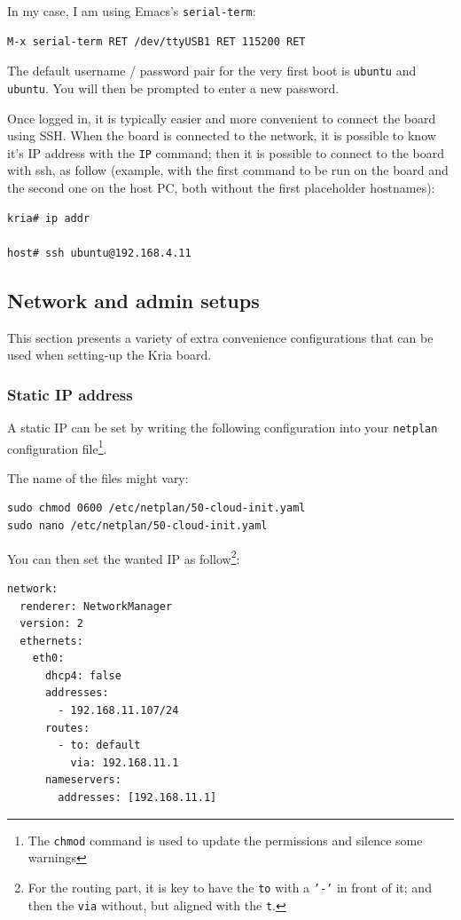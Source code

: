 \documentclass[10pt]{article}
\begin{document}
In my case, I am using Emacs's \texttt{serial-term}:
\begin{verbatim}
M-x serial-term RET /dev/ttyUSB1 RET 115200 RET
\end{verbatim}

The default username / password pair for the very first boot is \texttt{ubuntu} and \texttt{ubuntu}. You will then be prompted to enter a new password.

Once logged in, it is typically easier and more convenient to connect the board
using SSH. When the board is connected to the network, it is possible to know
it's IP address with the \texttt{IP} command; then it is possible to connect to
the board with ssh, as follow (example, with the first command to be run on the board
and the second one on the host PC, both without the first placeholder hostnames):
\begin{verbatim}
kria# ip addr

host# ssh ubuntu@192.168.4.11
\end{verbatim}

\subsection{Network and admin setups}
\label{sec:org530a03c}
This section presents a variety of extra convenience configurations
that can be used when setting-up the Kria board.

\subsubsection{Static IP address}
\label{sec:org158e635}
A static IP can be set by writing the following
configuration into your \texttt{netplan} configuration file\footnote{The \texttt{chmod} command is used to update the permissions and silence some warnings}.

The name of the files might vary:
\begin{verbatim}
sudo chmod 0600 /etc/netplan/50-cloud-init.yaml 
sudo nano /etc/netplan/50-cloud-init.yaml
\end{verbatim}

You can then set the wanted IP as follow\footnote{For the routing part, it is key to have the \texttt{to} with a \texttt{'-'} in front of
it; and then the \texttt{via} without, but aligned with the \texttt{t}.}:
\begin{verbatim}
network:
  renderer: NetworkManager
  version: 2
  ethernets:
    eth0:
      dhcp4: false
      addresses:
        - 192.168.11.107/24
      routes:
        - to: default
          via: 192.168.11.1
      nameservers:
        addresses: [192.168.11.1]
\end{verbatim}
\end{document}
